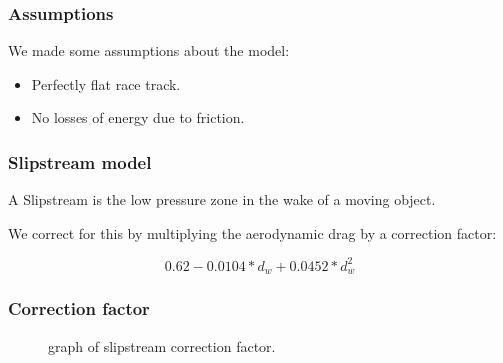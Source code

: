 \documentclass{beamer}
\begin{document}
\begin{frame}
\frametitle{Assumptions}
We made some assumptions about the model:
\vspace{0.7cm}
\pause
\begin{itemize}
\item Perfectly flat race track.
\pause
\vspace{0.7cm}
\item No losses of energy due to friction.
\pause
\vspace{0.7cm}
\end{itemize}
\end{frame}

\begin{frame}
\frametitle{Slipstream model}
A Slipstream is the low pressure zone in the wake of a moving object. \newline \par
\pause
We correct for this by multiplying the aerodynamic drag by a correction factor:

$$ 0.62 - 0.0104*d_w + 0.0452*d_w^2 $$

\end{frame}

\begin{frame}
\frametitle{Correction factor}
\begin{figure}[ht!]
  \centering
    \scalebox{0.6}{}
  \caption{graph of slipstream correction factor.}
\end{figure}
\end{frame}
\end{document}
